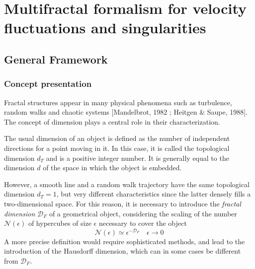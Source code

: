 \setchapterpreamble[u]{\vspace*{-3\baselineskip}\margintoc}
\chapter{Multifractal formalism for velocity fluctuations and singularities}

\section{General Framework}
\subsection{Concept presentation}
Fractal structures appear in many physical phenomena such as turbulence, random walks and chaotic systems [Mandelbrot, 1982 ; Heitgen \& Saupe, 1988]. The concept of dimension plays a central role in their characterization. 

The usual dimension of an object is defined as the number of independent directions for a point moving in it. In this case, it is called the topological dimension $d_T$ and is a positive integer number. It is generally equal to the dimension $d$ of the space in which the object is embedded. 

However, a smooth line and a random walk trajectory have the same topological dimension $d_T=1$, but very different characteristics since the latter densely fills a two-dimensional space. For this reason, it is necessary to introduce the \emph{fractal dimension} $\mathcal{D}_F$ of a geometrical object, considering the scaling of the number $\mathcal{N}(\epsilon)$ of hypercubes of size $\epsilon$ necessary to cover the object 
\begin{equation}
    \mathcal{N}(\epsilon)\simeq\epsilon^{-\mathcal{D}_F}\quad\epsilon\rightarrow0
\end{equation}
A more precise definition would require sophisticated methods, and lead to the introduction of the Hausdorff dimension, which can in some cases be different from $\mathcal{D}_F$. 

